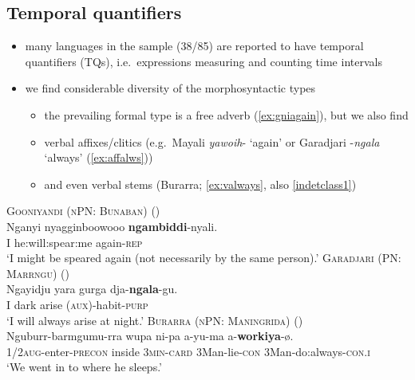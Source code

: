 \documentclass{article}
\makeatletter
\newcommand{\ofy}{/85} %
\makeatother
\begin{document}
\subsection{Temporal quantifiers}
\label{sec:temporals}
\begin{itemize}
\item many languages in the sample (38\ofy) are reported to have temporal quantifiers (TQs), i.e.\ expressions measuring and counting time intervals %
\item we find considerable diversity of the morphosyntactic types
  \begin{itemize}
  \item the prevailing formal type is a free adverb (\ref{ex:gniagain}), but we also find
  \item verbal affixes/clitics (e.g.\ Mayali \textit{yawoih}- `again' or Garadjari -\textit{ngala} `always' (\ref{ex:affalws}))
  \item and even verbal stems (Burarra; \ref{ex:valways}, also \ref{indetclass1})
  \end{itemize}
\end{itemize}

\begin{exe}
  \ex\label{ex:gniagain} \textsc{Gooniyandi (nPN: Bunaban)} (\citealt[462]{mcgregor90})\\
  \gll Nganyi nyagginboowooo \textbf{ngambiddi}-nyali.\\
  I he:will:spear:me again-\textsc{rep}\\
  \glt `I might be speared again (not necessarily by the same person).'
  \ex\label{ex:affalws} \textsc{Garadjari (PN: Marrngu)} (\citealt[42]{sands89})\\
  \gll Ngayidju yara gurga dja-\textbf{ngala}-gu.\\
  I dark arise (\textsc{aux})-habit-\textsc{purp}\\
  \glt `I will always arise at night.'
  \ex\label{ex:valways} \textsc{Burarra (nPN: Maningrida)} (\citealt[87]{green87})\\
  \gll Nguburr-barmgumu-rra wupa ni-pa a-yu-ma a-\textbf{workiya}-ø.\\
  \textsc{1/2aug}-enter-\textsc{precon} inside \textsc{3min-card}  3Man-lie-\textsc{con} 3Man-do:always-\textsc{con.i}\\
  \glt `We went in to where he sleeps.'
\end{exe}
\end{document}
